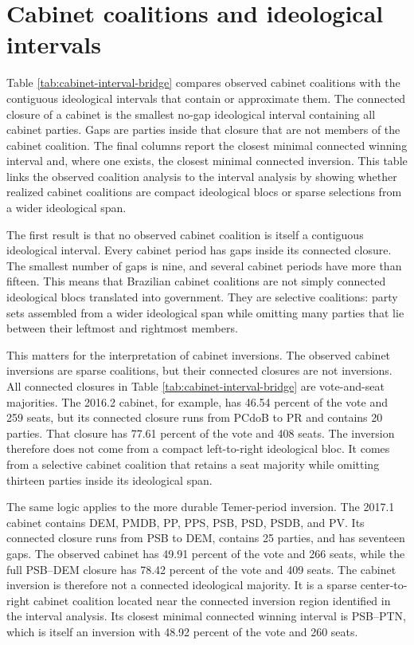 \documentclass[11pt]{article}
\newcommand{\RepoRoot}{/home/marcelo/Sync/Projects/electoral-inversion}%
\newcommand{\RepoRoot}{/home/marcelovmaciel/Sync/Projects/electoral_inversions}%
\newcommand{\ArtifactRoot}{\RepoRoot/processing/Processing/output/paper}
\begin{document}
\section{Cabinet coalitions and ideological intervals}
\label{app:cabinet-interval-bridge}

Table \ref{tab:cabinet-interval-bridge} compares observed cabinet coalitions
with the contiguous ideological intervals that contain or approximate them.
The connected closure of a cabinet is the smallest no-gap ideological interval
containing all cabinet parties. Gaps are parties inside that closure that are
not members of the cabinet coalition. The final columns report the closest
minimal connected winning interval and, where one exists, the closest minimal
connected inversion. This table links the observed coalition analysis to the
interval analysis by showing whether realized cabinet coalitions are compact
ideological blocs or sparse selections from a wider ideological span.



The first result is that no observed cabinet coalition is itself a contiguous
ideological interval. Every cabinet period has gaps inside its connected closure.
The smallest number of gaps is nine, and several cabinet periods have more than
fifteen. This means that Brazilian cabinet coalitions are not simply connected
ideological blocs translated into government. They are selective coalitions: party
sets assembled from a wider ideological span while omitting many parties that
lie between their leftmost and rightmost members.

This matters for the interpretation of cabinet inversions. The observed cabinet
inversions are sparse coalitions, but their connected closures are not inversions.
All connected closures in Table \ref{tab:cabinet-interval-bridge} are
vote-and-seat majorities. The 2016.2 cabinet, for example, has 46.54 percent of
the vote and 259 seats, but its connected closure runs from PCdoB to PR and
contains 20 parties. That closure has 77.61 percent of the vote and 408 seats.
The inversion therefore does not come from a compact left-to-right ideological
bloc. It comes from a selective cabinet coalition that retains a seat majority
while omitting thirteen parties inside its ideological span.

The same logic applies to the more durable Temer-period inversion. The 2017.1
cabinet contains DEM, PMDB, PP, PPS, PSB, PSD, PSDB, and PV. Its connected
closure runs from PSB to DEM, contains 25 parties, and has seventeen gaps. The
observed cabinet has 49.91 percent of the vote and 266 seats, while the full
PSB--DEM closure has 78.42 percent of the vote and 409 seats. The cabinet
inversion is therefore not a connected ideological majority. It is a sparse
center-to-right cabinet coalition located near the connected inversion region
identified in the interval analysis. Its closest minimal connected winning
interval is PSB--PTN, which is itself an inversion with 48.92 percent of the vote
and 260 seats.
\end{document}
